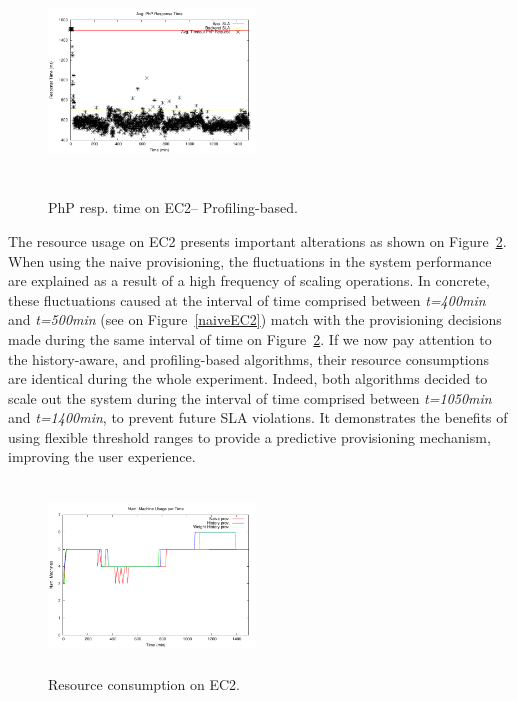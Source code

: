 \begin{figure}
\begin{center}
\includegraphics[width=0.49\textwidth, height=6cm]{./images/heterogeneous/avgTimeout_PhP_weightHistory}
\end{center}
\caption{ PhP resp. time on EC2-- Profiling-based.}
\label{historyWeightEC2}
\end{figure}

The resource usage on EC2 presents important alterations as shown on Figure~\ref{resEC2}. When using the naive provisioning, the fluctuations in the system performance are explained as a result of a high frequency of scaling operations. In concrete, these fluctuations caused at the interval of time comprised between \emph{t=400min} and \emph{t=500min} (see on Figure~\ref{naiveEC2}) match with the provisioning decisions made during the same interval of time on Figure~\ref{resEC2}. If we now pay attention to the history-aware, and profiling-based algorithms, their resource consumptions are identical during the whole experiment. Indeed, both algorithms decided to scale out the system during the interval of time comprised between \emph{t=1050min} and \emph{t=1400min}, to prevent future SLA violations. It demonstrates the benefits of using flexible threshold ranges to provide a predictive provisioning mechanism, improving the user experience.


\begin{figure}
\begin{center}
\includegraphics[width=0.49\textwidth, height=5cm]{./images/heterogeneous/numMachinesCompEC2}
\end{center}
\caption{Resource consumption on EC2.}
\label{resEC2}
\end{figure}


